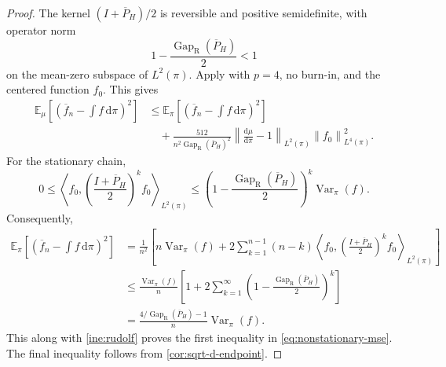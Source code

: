 \documentclass[11pt]{article}
\newcommand{\E}{\mathbb E}
\newcommand{\Var}{\operatorname{Var}}
\newcommand{\Gap}{\operatorname{Gap}_{\mathrm{R}}}
\newcommand{\ip}[2]{\left\langle #1,#2\right\rangle}
\newcommand{\norm}[1]{\left\lVert #1\right\rVert}
\newcommand{\1}{\mathbf 1}
\newcommand{\df}{\mathrm{d}}
\begin{document}
	\begin{proof}
		The kernel $(I+\overline P_H)/2$ is reversible and
		positive semidefinite, with operator norm
		\[
		1-\frac{\Gap(\overline P_H)}2<1
		\]
		on the mean-zero subspace of $L^2(\pi)$.
		Apply \citet[Theorem~3.41]{Rudolf2012} with
		$p=4$, no burn-in, and the centered function $f_0$.
		This gives
		\begin{equation} \label{ine:rudolf}
			\begin{aligned}
				\E_\mu\left[
				\left(\overline f_n-\int f\,\df\pi\right)^2
				\right]
				&\leq
				\E_\pi\left[
				\left(\overline f_n-\int f\,\df\pi\right)^2
				\right]\\
				&\quad+
				\frac{512}{n^2\Gap(\overline P_H)^2}
				\norm{\frac{\df\mu}{\df\pi}-1}_{L^2(\pi)}
				\norm{f_0}_{L^4(\pi)}^2.
			\end{aligned}
		\end{equation}
		For the stationary chain,
		\[
		0\leq
		\ip{f_0}{
			\left(\frac{I+\overline P_H}{2}\right)^k f_0
		}_{L^2(\pi)}
		\leq
		\left(1-\frac{\Gap(\overline P_H)}2\right)^k
		\Var_\pi(f).
		\]
		Consequently,
		\[
		\begin{aligned}
			\E_\pi\left[
			\left(\overline f_n-\int f\,\df\pi\right)^2
			\right]
			&=
			\frac1{n^2}\left[
			n\Var_\pi(f)+
			2\sum_{k=1}^{n-1}(n-k)
			\ip{f_0}{
				\left(\frac{I+\overline P_H}{2}\right)^k f_0
			}_{L^2(\pi)}
			\right]\\
			&\leq
			\frac{\Var_\pi(f)}n
			\left[
			1+2\sum_{k=1}^{\infty}
			\left(1-\frac{\Gap(\overline P_H)}2\right)^k
			\right]\\
			&=
			\frac{4/\Gap(\overline P_H)-1}{n}\Var_\pi(f).
		\end{aligned}
		\]
		This along with \eqref{ine:rudolf} proves the first inequality in \eqref{eq:nonstationary-mse}.
		The final inequality follows from \cref{cor:sqrt-d-endpoint}.
		
	\end{proof}
	
\end{document}
